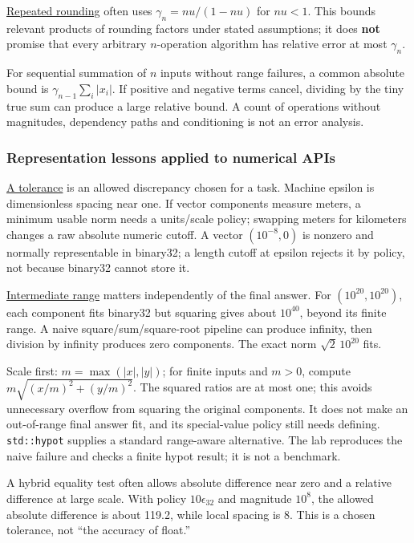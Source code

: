 \hyperref[appendix-f82e270791c8]{Repeated rounding} often uses \(\gamma_n=nu/(1-nu)\) for \(nu<1\). This bounds relevant products of rounding factors under stated assumptions; it does \textbf{not} promise that every arbitrary \(n\)-operation algorithm has relative error at most \(\gamma_n\).

For sequential summation of \(n\) inputs without range failures, a common absolute bound is \(\gamma_{n-1}\sum_i|x_i|\). If positive and negative terms cancel, dividing by the tiny true sum can produce a large relative bound. A count of operations without magnitudes, dependency paths and conditioning is not an error analysis.

\subsubsection{Representation lessons applied to numerical APIs}\label{05-engine-i-ch001-representation-lessons-applied-to-numerical-apis}

\hyperref[appendix-0ec599f8ba27]{A tolerance} is an allowed discrepancy chosen for a task. Machine epsilon is dimensionless spacing near one. If vector components measure meters, a minimum usable norm needs a units/scale policy; swapping meters for kilometers changes a raw absolute numeric cutoff. A vector \((10^{-8},0)\) is nonzero and normally representable in binary32; a length cutoff at epsilon rejects it by policy, not because binary32 cannot store it.

\hyperref[appendix-7f1e17dcafb1]{Intermediate range} matters independently of the final answer. For \((10^{20},10^{20})\), each component fits binary32 but squaring gives about \(10^{40}\), beyond its finite range. A naive square/sum/square-root pipeline can produce infinity, then division by infinity produces zero components. The exact norm \(\sqrt2\,10^{20}\) fits.

Scale first: \(m=\max(|x|,|y|)\); for finite inputs and \(m>0\), compute \(m\sqrt{(x/m)^2+(y/m)^2}\). The squared ratios are at most one; this avoids unnecessary overflow from squaring the original components. It does not make an out-of-range final answer fit, and its special-value policy still needs defining. \texttt{std::hypot} supplies a standard range-aware alternative. The lab reproduces the naive failure and checks a finite hypot result; it is not a benchmark.

A hybrid equality test often allows absolute difference near zero and a relative difference at large scale. With policy \(10\epsilon_{32}\) and magnitude \(10^8\), the allowed absolute difference is about 119.2, while local spacing is 8. This is a chosen tolerance, not ``the accuracy of float.''

